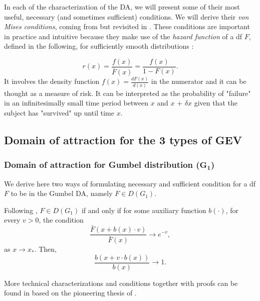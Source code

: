 In each of the characterization of the DA, we will present some of their most useful, necessary (and sometimes sufficient) conditions. We will derive their \emph{von Mises conditions}, coming from \cite{von_mises_distribution_1936} but revisited in \cite{falk_von_1993}. These conditions are important in practice and intuitive because they make use of the \emph{hazard function} of a df $F$, defined in the following, for sufficiently smooth distributions :

\begin{equation}\label{haz}
r(x)=\frac{f(x)}{\bar{F}(x)}= \frac{f(x)}{1-F(x)}.
\end{equation}
It involves the density function $f(x)=\frac{dF(x)}{d(x)}$ in the numerator and it can be thought as a measure of risk. It can be interpreted as the probability of "failure" in an infinitesimally small time period between $x$ and $x$ + $\delta x$ given
that the subject has "survived" up until time $x$.


\subsection{Domain of attraction for the 3 types of GEV}


\subsubsection*{Domain of attraction for Gumbel distribution ($\mathbf{G_1}$) }  We derive here two ways of formulating necessary and sufficient condition for a df $F$ to be in the Gumbel DA, namely $F\in D(G_1)$.

\begin{theorem} Following \cite[pp.72]{beirlant_statistics_2006},
	$F\in D(G_1)$ if and only if for some auxiliary function $b(\cdot )$, for every $v>0$, the condition
	\begin{equation}
	\frac{\bar{F}(x+b(x)\cdot v)}{\bar{F}(x)} \to e^{-v},
	\end{equation}
    as $x\to x_*$. Then, 
	\begin{equation*}
	\frac{b(x+v\cdot b(x))}{b(x)}\to 1 .
	\end{equation*} 
\end{theorem}
More technical characterizations and conditions together with proofs can be found in \citet[pp.20-33]{haan_extreme_2006} based on the pioneering thesis of \citet{haan_regular_1970}. 

